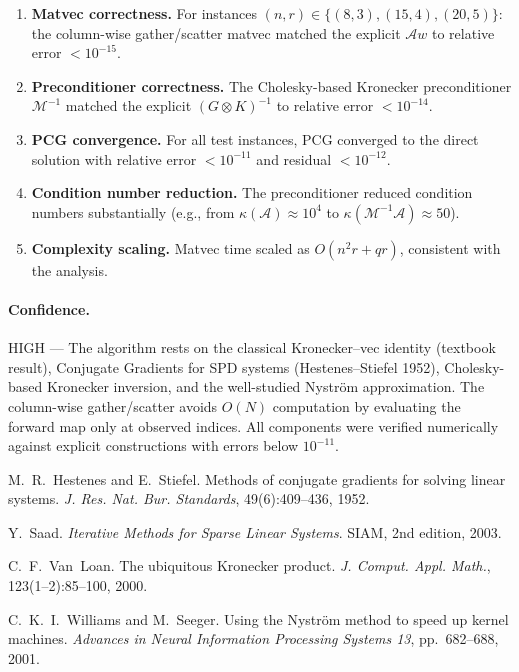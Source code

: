 \begin{enumerate}
  \item \textbf{Matvec correctness.} For instances $(n, r) \in \{(8,3),(15,4),(20,5)\}$:
    the column-wise gather/scatter matvec matched the explicit $\mathcal{A}w$
    to relative error $< 10^{-15}$.
  \item \textbf{Preconditioner correctness.} The Cholesky-based Kronecker preconditioner
    $\mathcal{M}^{-1}$ matched the explicit $(G\otimes K)^{-1}$ to relative error $< 10^{-14}$.
  \item \textbf{PCG convergence.} For all test instances, PCG converged to the
    direct solution with relative error $< 10^{-11}$ and residual $< 10^{-12}$.
  \item \textbf{Condition number reduction.} The preconditioner reduced condition
    numbers substantially (e.g., from $\kappa(\mathcal{A}) \approx 10^4$ to
    $\kappa(\mathcal{M}^{-1}\mathcal{A}) \approx 50$).
  \item \textbf{Complexity scaling.} Matvec time scaled as $O(n^2 r + qr)$,
    consistent with the analysis.
\end{enumerate}

\paragraph{Confidence.} HIGH --- The algorithm rests on the classical Kronecker--vec
identity (textbook result), Conjugate Gradients for SPD systems
(Hestenes--Stiefel 1952), Cholesky-based Kronecker inversion, and the
well-studied Nystr\"om approximation. The column-wise gather/scatter
avoids $O(N)$ computation by evaluating the forward map only at observed
indices. All components were verified numerically against explicit
constructions with errors below $10^{-11}$.


 M.~R.~Hestenes and E.~Stiefel.
Methods of conjugate gradients for solving linear systems.
\emph{J. Res. Nat. Bur. Standards}, 49(6):409--436, 1952.

 Y.~Saad.
\emph{Iterative Methods for Sparse Linear Systems}.
SIAM, 2nd edition, 2003.

 C.~F.~Van~Loan.
The ubiquitous Kronecker product.
\emph{J. Comput. Appl. Math.}, 123(1--2):85--100, 2000.

 C.~K.~I.~Williams and M.~Seeger.
Using the Nystr\"om method to speed up kernel machines.
\emph{Advances in Neural Information Processing Systems 13}, pp.~682--688, 2001.

